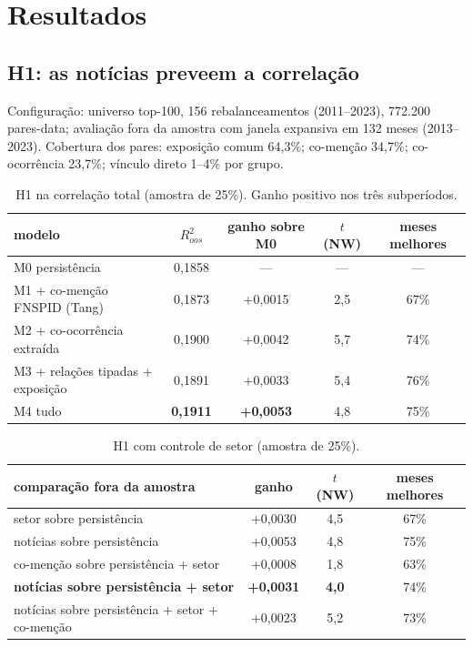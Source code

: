 \documentclass[11pt,a4paper]{article}
\begin{document}
\section{Resultados}\label{sec:resultados}

\subsection{H1: as notícias preveem a correlação}

Configuração: universo top-100, 156 rebalanceamentos (2011--2023), 772.200 pares-data; avaliação fora
da amostra com janela expansiva em 132 meses (2013--2023). Cobertura dos pares: exposição comum 64,3\%;
co-menção 34,7\%; co-ocorrência 23,7\%; vínculo direto 1--4\% por grupo.

\begin{table}[h]
\centering\small
\begin{tabular}{lcccc}
\toprule
modelo & $R^2_{oos}$ & ganho sobre M0 & $t$ (NW) & meses melhores \\
\midrule
M0 persistência & 0,1858 & --- & --- & --- \\
M1 + co-menção FNSPID (Tang) & 0,1873 & +0,0015 & 2,5 & 67\% \\
M2 + co-ocorrência extraída & 0,1900 & +0,0042 & 5,7 & 74\% \\
M3 + relações tipadas + exposição & 0,1891 & +0,0033 & 5,4 & 76\% \\
M4 tudo & \textbf{0,1911} & \textbf{+0,0053} & 4,8 & 75\% \\
\bottomrule
\end{tabular}
\caption{H1 na correlação total (amostra de 25\%). Ganho positivo nos três subperíodos.}
\end{table}

\begin{table}[h]
\centering\small
\begin{tabular}{lccc}
\toprule
comparação fora da amostra & ganho & $t$ (NW) & meses melhores \\
\midrule
setor sobre persistência & +0,0030 & 4,5 & 67\% \\
notícias sobre persistência & +0,0053 & 4,8 & 75\% \\
co-menção sobre persistência + setor & +0,0008 & 1,8 & 63\% \\
\textbf{notícias sobre persistência + setor} & \textbf{+0,0031} & \textbf{4,0} & 74\% \\
notícias sobre persistência + setor + co-menção & +0,0023 & 5,2 & 73\% \\
\bottomrule
\end{tabular}
\caption{H1 com controle de setor (amostra de 25\%).}
\end{table}
\end{document}
